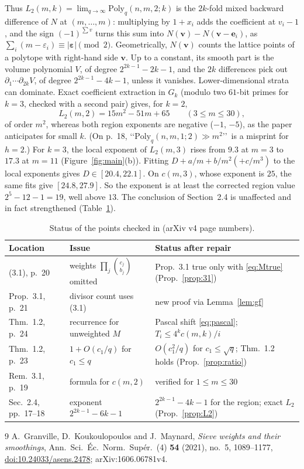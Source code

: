\documentclass[11pt,a4paper]{amsart}
\theoremstyle{remark}
\begin{document}
Thus $L_2(m,k)=\lim_{q\to\infty}\mathrm{Poly}_q(n,m,2;k)$ is the $2k$-fold mixed backward difference of $N$
at $(m,\dots,m)$: multiplying by $1+x_i$ adds the coefficient at $v_i-1$, and the sign $(-1)^{\sum v}$
turns this sum into $N(\mathbf v)-N(\mathbf v-\mathbf e_i)$, as $\sum_i(m-\varepsilon_i)\equiv|\boldsymbol\varepsilon|\pmod2$. Geometrically, $N(\mathbf v)$ counts the
lattice points of a polytope with right-hand side $\mathbf v$. Up to a constant, its smooth part is the
volume polynomial $V$, of degree $2^{2k-1}-2k-1$, and the $2k$ differences pick out
$\partial_1\cdots\partial_{2k}V$, of degree $2^{2k-1}-4k-1$, unless it vanishes. Lower-dimensional strata
can dominate. Exact coefficient extraction in $G_k$ (modulo two $61$-bit primes for $k=3$, checked with a
second pair) gives, for $k=2,$
\[
L_2(m,2)=15m^2-51m+65\qquad(3\le m\le30),
\]
of order $m^2$, whereas both region exponents are negative ($-1$, $-5$), as the paper anticipates for small
$k$. (On p.~18, \lq\lq$\mathrm{Poly}_q(n,m,1;2)\gg m^2$\rq\rq\ is a misprint for $h=2$.) For $k=3$, the local exponent of $L_2(m,3)$ rises from $9.3$ at $m=3$ to $17.3$ at $m=11$
(Figure~\ref{fig:main}(b)). Fitting $D+a/m+b/m^2(+c/m^3)$ to the local exponents gives $D\in[20.4,22.1]$.
On $c(m,3)$, whose exponent is $25$, the same fits give $[24.8,27.9]$. So the exponent is at least the corrected region value $2^{5}-12-1=19$, well above $13$. The conclusion of Section~2.4 is unaffected and in fact
strengthened (Table~\ref{tab:sum}).

\begin{table}[!ht]
\centering\footnotesize
\caption{Status of the points checked in \cite{GKM} (arXiv v4 page numbers).}\label{tab:sum}
\begin{tabular}{lll}
\toprule
Location & Issue & Status after repair\\
\midrule
(3.1), p.~20 & weights $\prod_j\binom{c_j}{b_j}$ omitted & Prop.~3.1 true only with \eqref{eq:Mtrue} (Prop.~\ref{prop:31})\\
Prop.~3.1, p.~21 & divisor count uses (3.1) & new proof via Lemma~\ref{lem:gf}\\
Thm.~1.2, p.~24 & recurrence for unweighted $M$ & Pascal shift \eqref{eq:pascal}; $T_i\le4^kc(m,k)/i$\\
Thm.~1.2, p.~23 & $1+O(c_1/q)$ for $c_1\le q$ & $O(c_1^2/q)$ for $c_1\le\sqrt q$; Thm.~1.2 holds (Prop.~\ref{prop:ratio})\\
Rem.~3.1, p.~19 & formula for $c(m,2)$ & verified for $1\le m\le30$\\
Sec.~2.4, pp.~17--18 & exponent $2^{2k-1}-6k-1$ & $2^{2k-1}-4k-1$ for the region; exact $L_2$ (Prop.~\ref{prop:L2})\\
\bottomrule
\end{tabular}
\end{table}
\begin{thebibliography}{9}
 A.~Granville, D.~Koukoulopoulos and J.~Maynard, \emph{Sieve weights and their smoothings},
Ann.\ Sci.\ \'Ec.\ Norm.\ Sup\'er.\ (4) \textbf{54} (2021), no.~5, 1089--1177, \href{https://doi.org/10.24033/asens.2478}{doi:10.24033/asens.2478}; arXiv:1606.06781v4.
\end{thebibliography}
\end{document}
